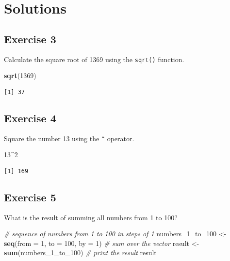 \documentclass[]{book}
\newenvironment{Shaded}{\begin{snugshade}}{\end{snugshade}}
\newcommand{\KeywordTok}[1]{\textcolor[rgb]{0.13,0.29,0.53}{\textbf{#1}}}
\newcommand{\DataTypeTok}[1]{\textcolor[rgb]{0.13,0.29,0.53}{#1}}
\newcommand{\DecValTok}[1]{\textcolor[rgb]{0.00,0.00,0.81}{#1}}
\newcommand{\StringTok}[1]{\textcolor[rgb]{0.31,0.60,0.02}{#1}}
\newcommand{\CommentTok}[1]{\textcolor[rgb]{0.56,0.35,0.01}{\textit{#1}}}
\newcommand{\OperatorTok}[1]{\textcolor[rgb]{0.81,0.36,0.00}{\textbf{#1}}}
\newcommand{\NormalTok}[1]{#1}
\theoremstyle{definition}
\theoremstyle{definition}
\theoremstyle{definition}
\theoremstyle{remark}
\begin{document}
\section{Solutions}\label{solutions}

\subsection{Exercise 3}\label{exercise-3}

Calculate the square root of 1369 using the \texttt{sqrt()} function.

\begin{Shaded}
\begin{Highlighting}[]
\KeywordTok{sqrt}\NormalTok{(}\DecValTok{1369}\NormalTok{)}
\end{Highlighting}
\end{Shaded}

\begin{verbatim}
[1] 37
\end{verbatim}

\subsection{Exercise 4}\label{exercise-4}

Square the number 13 using the \texttt{\^{}} operator.

\begin{Shaded}
\begin{Highlighting}[]
\DecValTok{13}\OperatorTok{^}\DecValTok{2}
\end{Highlighting}
\end{Shaded}

\begin{verbatim}
[1] 169
\end{verbatim}

\subsection{Exercise 5}\label{exercise-5}

What is the result of summing all numbers from 1 to 100?

\begin{Shaded}
\begin{Highlighting}[]
\CommentTok{# sequence of numbers from 1 to 100 in steps of 1}
\NormalTok{numbers_1_to_}\DecValTok{100}\NormalTok{ <-}\StringTok{ }\KeywordTok{seq}\NormalTok{(}\DataTypeTok{from =} \DecValTok{1}\NormalTok{, }\DataTypeTok{to =} \DecValTok{100}\NormalTok{, }\DataTypeTok{by =} \DecValTok{1}\NormalTok{)}
\CommentTok{# sum over the vector}
\NormalTok{result <-}\StringTok{ }\KeywordTok{sum}\NormalTok{(numbers_1_to_}\DecValTok{100}\NormalTok{)}
\CommentTok{# print the result}
\NormalTok{result}
\end{Highlighting}
\end{Shaded}
\end{document}
